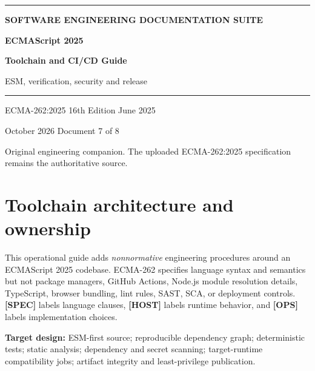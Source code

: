\documentclass[11pt,letterpaper]{article}
\begin{document}
\hypersetup{pageanchor=false}%
\begin{titlepage}
\thispagestyle{empty}
\vspace*{2.8cm}
{\color{Gold}\rule{18mm}{3pt}}\par\vspace{18mm}
{\sffamily\Large\bfseries\color{Teal} SOFTWARE ENGINEERING DOCUMENTATION SUITE}\par
\vspace{8mm}
{\sffamily\huge\bfseries\color{DeepNavy} ECMAScript 2025 }\par
\vspace{4mm}
{\sffamily\fontsize{24}{29}\selectfont\bfseries\color{DeepNavy} Toolchain and CI/CD Guide }\par
\vspace{10mm}
{\large\color{Slate} ESM, verification, security and release }\par
\vspace{16mm}
{\color{Teal}\rule{\textwidth}{0.8pt}}\par
\vfill
{\sffamily\color{Slate}\large ECMA-262:2025 \textbullet{} 16th Edition \textbullet{} June 2025}\par
\vspace{3mm}
{\sffamily\color{Slate} October 2026 \textbullet{} Document 7 of 8}\par
\vspace{3mm}
{\small\color{Slate} Original engineering companion. The uploaded ECMA-262:2025 specification remains the authoritative source.}\par
\end{titlepage}\hypersetup{pageanchor=true}
\tableofcontents
\clearpage
\section{Toolchain architecture and ownership}\label{toolchain-architecture-and-ownership}

This operational guide adds \emph{nonnormative} engineering procedures around an ECMAScript 2025 codebase. ECMA-262 specifies language syntax and semantics but not package managers, GitHub Actions, Node.js module resolution details, TypeScript, browser bundling, lint rules, SAST, SCA, or deployment controls. \textbf{{[}SPEC{]}} labels language clauses, \textbf{{[}HOST{]}} labels runtime behavior, and \textbf{{[}OPS{]}} labels implementation choices.

\textbf{Target design:} ESM-first source; reproducible dependency graph; deterministic tests; static analysis; dependency and secret scanning; target-runtime compatibility jobs; artifact integrity and least-privilege publication.
\end{document}
